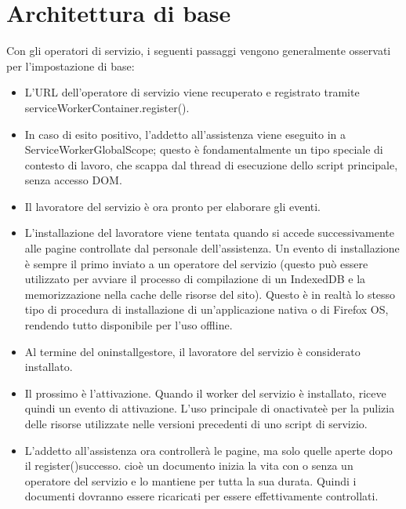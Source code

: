 \documentclass[italian]{article}
\begin{document}
\section{Architettura di base}
Con gli operatori di servizio, i seguenti passaggi vengono generalmente osservati per l'impostazione di base:
\begin{itemize}
\item L'URL dell'operatore di servizio viene recuperato e registrato tramite serviceWorkerContainer.register().
\item In caso di esito positivo, l'addetto all'assistenza viene eseguito in a ServiceWorkerGlobalScope; questo è fondamentalmente un tipo speciale di contesto di lavoro, che scappa dal thread di esecuzione dello script principale, senza accesso DOM.
\item Il lavoratore del servizio è ora pronto per elaborare gli eventi.
\item L'installazione del lavoratore viene tentata quando si accede successivamente alle pagine controllate dal personale dell'assistenza. Un evento di installazione è sempre il primo inviato a un operatore del servizio (questo può essere utilizzato per avviare il processo di compilazione di un IndexedDB e la memorizzazione nella cache delle risorse del sito). Questo è in realtà lo stesso tipo di procedura di installazione di un'applicazione nativa o di Firefox OS, rendendo tutto disponibile per l'uso offline.
\item Al termine del oninstallgestore, il lavoratore del servizio è considerato installato.
\item Il prossimo è l'attivazione. Quando il worker del servizio è installato, riceve quindi un evento di attivazione. L'uso principale di onactivateè per la pulizia delle risorse utilizzate nelle versioni precedenti di uno script di servizio.
\item L'addetto all'assistenza ora controllerà le pagine, ma solo quelle aperte dopo il register()successo. cioè un documento inizia la vita con o senza un operatore del servizio e lo mantiene per tutta la sua durata. Quindi i documenti dovranno essere ricaricati per essere effettivamente controllati.
\end{itemize}
\end{document}
